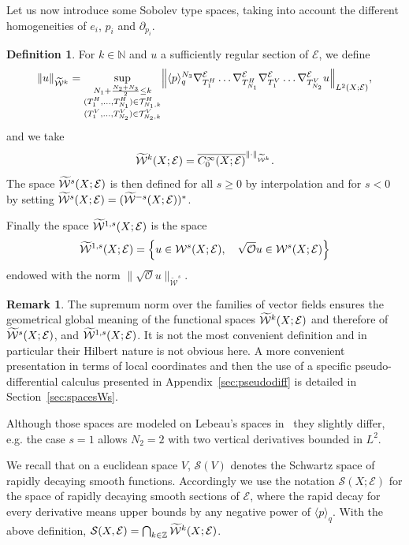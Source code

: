 \documentclass[10pt]{amsart}
\theoremstyle{definition}\newtheorem{defi}[theo]{Definition}\newtheorem{rema}[theo]{Remark}\newtheorem{exam}[theo]{Example}\newtheorem{exem}[theo]{Example}\newtheorem{nota}[theo]{Notation}
\newcommand{\Z}{\mathbb{Z}}
\newcommand{\N}{\mathbb{N}}
\newcommand{\clW}{\mathcal{W}}
\newcommand{\clT}{\mathcal{T}}
\newcommand{\clO}{\mathcal{O}}
\newcommand{\clE}{\mathcal{E}}
\newcommand{\clS}{\mathcal{S}}
\newcommand\norm[1]{\left\lVert#1\right\rVert}
\let\oldtilde\tilde
\renewcommand*{\tilde}[1]{\mathchoice{\widetilde{#1}}{\widetilde{#1}}{\oldtilde{#1}}{\oldtilde{#1}}}
\let\originalleft\left
\let\originalright\right
\renewcommand{\left}{\mathopen{}\mathclose\bgroup\originalleft}
\renewcommand{\right}{\aftergroup\egroup\originalright}
\begin{document}
Let us now introduce some Sobolev type spaces, taking into account the different homogeneities of $e_{i}$, $p_{i}$ and $\partial_{p_{i}}$.
\begin{defi}\label{de:tW}
For $k \in \N$ and $u$ a sufficiently regular section of $\clE$, we define
\begin{equation}
\norm{u}_{\widetilde{\clW}^{k}}=
\sup_{\substack{N_{1}+\frac{N_{2}+N_{3}}{2}\leq k\\
(T_{1}^{H},\dots, T_{N_{1}}^{H})\in \clT_{N_{1},k}^{H}\\
(T_{1}^{V},\dots, T_{N_{2}}^{V})\in \clT_{N_{2},k}^{V} \\
}}
\norm{\langle p \rangle_{q}^{N_3} \nabla^{\clE}_{T_{1}^{H}}\dots \nabla^{\clE}_{T_{N_{1}}^{H}}
\nabla^{\clE}_{T_{1}^{V}}\dots \nabla^{\clE}_{T_{N_{2}}^{V}} u}_{L^2(X; \clE)},
\end{equation}
and we take
\begin{equation}
\tilde{\clW}^k(X; \clE) = \overline{C^\infty_0(X; \clE)}^{\norm{\cdot}_{\widetilde{\clW}^k}}.
\end{equation}
The space $\tilde{\clW}^s(X; \clE)$ is then defined for all $s \ge 0$ by interpolation and for $s<0$ by setting $\tilde{\clW}^s(X;\clE) = (\tilde{\clW}^{-s}(X;\clE))^*$.

Finally the space $\tilde{\clW}^{1,s}(X;\clE)$ is the space
\[
\tilde{\clW}^{1,s}(X;\clE)=\left\{u\in \clW^{s}(X;\clE), \quad \sqrt{\clO}u\in \clW^{s}(X;\clE)\right\}
\]
endowed with the norm $\|\sqrt{\clO}u\|_{\widetilde{\clW}^{s}}$.
\end{defi}

\begin{rema}\label{re:compLeb}
The supremum norm over the families of vector fields ensures the geometrical global meaning of the functional spaces $\tilde{\clW}^k(X;\clE)$ and therefore of $\tilde{\clW}^{s}(X;\clE)$, and $\tilde{\clW}^{1,s}(X;\clE)$. It is not the most convenient definition and in particular their Hilbert nature is not obvious here. A more convenient presentation in terms of local coordinates and then the use of a specific pseudo-differential calculus presented in Appendix~\ref{sec:pseudodiff} is detailed in Section~\ref{sec:spacesWs}.

Although those spaces are modeled on Lebeau's spaces in~\cite{Leb1,Leb2} they slightly differ, e.g. the case $s=1$ allows $N_2=2$ with two vertical derivatives bounded in $L^2$.

We recall that on a euclidean space $V$, $\clS(V)$ denotes the Schwartz space of rapidly decaying smooth functions. Accordingly we use the notation $\clS(X;\clE)$ for the space of rapidly decaying smooth sections of $\clE$, where the rapid decay for every derivative means upper bounds by any negative power of $\langle p\rangle_{q}$. With the above definition, $\clS(X,\clE)=\bigcap_{k\in \Z}\tilde{\clW}^{k}(X;\clE)$.
\end{rema}
\end{document}

